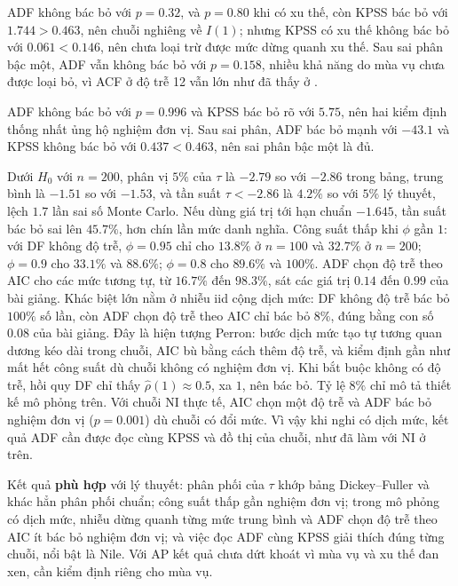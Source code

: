  ADF không bác bỏ với $p=0.32$, và $p=0.80$ khi có xu thế, còn KPSS bác bỏ với $1.744>0.463$, nên chuỗi nghiêng về $I(1)$; nhưng KPSS có xu thế không bác bỏ với $0.061<0.146$, nên chưa loại trừ được mức dừng quanh xu thế. Sau sai phân bậc một, ADF vẫn không bác bỏ với $p=0.158$, nhiều khả năng do mùa vụ chưa được loại bỏ, vì ACF ở độ trễ 12 vẫn lớn như đã thấy ở .

 ADF không bác bỏ với $p=0.996$ và KPSS bác bỏ rõ với $5.75$, nên hai kiểm định thống nhất ủng hộ nghiệm đơn vị. Sau sai phân, ADF bác bỏ mạnh với $-43.1$ và KPSS không bác bỏ với $0.437<0.463$, nên sai phân bậc một là đủ.

 Dưới $H_0$ với $n=200$, phân vị $5\%$ của $\tau$ là $-2.79$ so với $-2.86$ trong bảng, trung bình là $-1.51$ so với $-1.53$, và tần suất $\tau<-2.86$ là $4.2\%$ so với $5\%$ lý thuyết, lệch $1.7$ lần sai số Monte Carlo. Nếu dùng giá trị tới hạn chuẩn $-1.645$, tần suất bác bỏ sai lên $45.7\%$, hơn chín lần mức danh nghĩa. Công suất thấp khi $\phi$ gần $1$: với DF không độ trễ, $\phi=0.95$ chỉ cho $13.8\%$ ở $n=100$ và $32.7\%$ ở $n=200$; $\phi=0.9$ cho $33.1\%$ và $88.6\%$; $\phi=0.8$ cho $89.6\%$ và $100\%$. ADF chọn độ trễ theo AIC cho các mức tương tự, từ $16.7\%$ đến $98.3\%$, sát các giá trị $0.14$ đến $0.99$ của bài giảng. Khác biệt lớn nằm ở nhiễu iid cộng dịch mức: DF không độ trễ bác bỏ $100\%$ số lần, còn ADF chọn độ trễ theo AIC chỉ bác bỏ $8\%$, đúng bằng con số $0.08$ của bài giảng. Đây là hiện tượng Perron: bước dịch mức tạo tự tương quan dương kéo dài trong chuỗi, AIC bù bằng cách thêm độ trễ, và kiểm định gần như mất hết công suất dù chuỗi không có nghiệm đơn vị. Khi bắt buộc không có độ trễ, hồi quy DF chỉ thấy $\hat\rho(1)\approx0.5$, xa $1$, nên bác bỏ. Tỷ lệ $8\%$ chỉ mô tả thiết kế mô phỏng trên. Với chuỗi NI thực tế, AIC chọn một độ trễ và ADF bác bỏ nghiệm đơn vị ($p=0.001$) dù chuỗi có đổi mức. Vì vậy khi nghi có dịch mức, kết quả ADF cần được đọc cùng KPSS và đồ thị của chuỗi, như đã làm với NI ở trên.

 Kết quả \textbf{phù hợp} với lý thuyết: phân phối của $\tau$ khớp bảng Dickey--Fuller và khác hẳn phân phối chuẩn; công suất thấp gần nghiệm đơn vị; trong mô phỏng có dịch mức, nhiễu dừng quanh từng mức trung bình và ADF chọn độ trễ theo AIC ít bác bỏ nghiệm đơn vị; và việc đọc ADF cùng KPSS giải thích đúng từng chuỗi, nổi bật là Nile. Với AP kết quả chưa dứt khoát vì mùa vụ và xu thế đan xen, cần kiểm định riêng cho mùa vụ.
\clearpage
